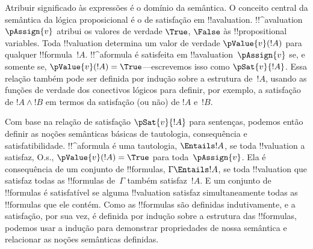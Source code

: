 \documentclass[../../../include/open-logic-section]{subfiles}
\begin{document}
Atribuir significado às expressões é o domínio da semântica. O
conceito central da semântica da lógica proposicional é o de
satisfação em !!a{valuation}. !!^a{valuation}~$\pAssign{v}$ atribui
os valores de verdade $\True$, $\False$ às !!{propositional variable}s. Toda
!!{valuation} determina um valor de verdade $\pValue{v}(!A)$ para qualquer
!!{formula}~$!A$. !!^a{formula} é satisfeita em
!!a{valuation}~$\pAssign{v}$ se, e somente se, $\pValue{v}(!A) = \True$---escrevemos
isso como $\pSat{v}{!A}$. Essa relação também pode ser definida por indução sobre
a estrutura de~$!A$, usando as funções de verdade dos conectivos
lógicos para definir, por exemplo, a satisfação de $!A \land !B$ em termos da
satisfação (ou não) de $!A$ e~$!B$.

Com base na relação de satisfação $\pSat{v}{!A}$ para sentenças,
podemos então definir as noções semânticas básicas de tautologia,
consequência e satisfatibilidade. !!^a{formula} é uma tautologia,
$\Entails !A$, se toda !!{valuation} a satisfaz, O.s.\@,
$\pValue{v}(!A) = \True$ para toda~$\pAssign{v}$. Ela é consequência de um
conjunto de !!{formula}s, $\Gamma \Entails !A$, se toda !!{valuation} que
satisfaz todas as !!{formula}s de~$\Gamma$ também satisfaz~$!A$. E um
conjunto de !!{formula}s é satisfatível se alguma !!{valuation} satisfaz simultaneamente todas as
!!{formula}s que ele contém. Como as !!{formula}s são
definidas indutivamente, e a satisfação, por sua vez, é definida por indução
sobre a estrutura das !!{formula}s, podemos usar a indução para demonstrar
propriedades de nossa semântica e relacionar as noções semânticas
definidas.
\end{document}
